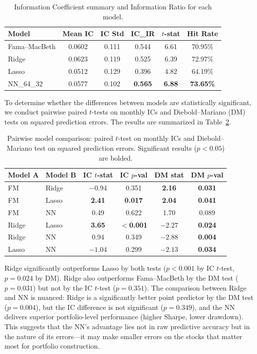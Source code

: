 \documentclass[11pt]{article}
\begin{document}
\begin{table}[H]
\centering
\caption{Information Coefficient summary and Information Ratio for each model.}
\label{tab:ic_ir}
\begin{tabular}{lccccc}
\toprule
Model & Mean IC & IC Std & IC\_IR & $t$-stat & Hit Rate \\
\midrule
Fama--MacBeth & 0.0602 & 0.111 & 0.544 & 6.61 & 70.95\% \\
Ridge         & 0.0623 & 0.119 & 0.525 & 6.39 & 72.97\% \\
Lasso         & 0.0512 & 0.129 & 0.396 & 4.82 & 64.19\% \\
NN\_64\_32    & 0.0577 & 0.102 & \textbf{0.565} & \textbf{6.88} & \textbf{73.65\%} \\
\bottomrule
\end{tabular}
\end{table}

To determine whether the differences between models are statistically significant, we conduct pairwise paired $t$-tests on monthly ICs and Diebold--Mariano (DM) tests \cite{diebold1995} on squared prediction errors. The results are summarized in Table~\ref{tab:significance}.

\begin{table}[H]
\centering
\caption{Pairwise model comparison: paired $t$-test on monthly ICs and Diebold--Mariano test on squared prediction errors. Significant results ($p < 0.05$) are bolded.}
\label{tab:significance}
\begin{tabular}{llcccc}
\toprule
Model A & Model B & IC $t$-stat & IC $p$-val & DM stat & DM $p$-val \\
\midrule
FM    & Ridge   & $-0.94$ & 0.351 & \textbf{2.16} & \textbf{0.031} \\
FM    & Lasso   & \textbf{2.41} & \textbf{0.017} & \textbf{2.04} & \textbf{0.041} \\
FM    & NN      & 0.49 & 0.622 & 1.70 & 0.089 \\
Ridge & Lasso   & \textbf{3.65} & \textbf{$<$0.001} & \textbf{$-2.27$} & \textbf{0.024} \\
Ridge & NN      & 0.94 & 0.349 & \textbf{$-2.88$} & \textbf{0.004} \\
Lasso & NN      & $-1.04$ & 0.299 & \textbf{$-2.13$} & \textbf{0.034} \\
\bottomrule
\end{tabular}
\end{table}

Ridge significantly outperforms Lasso by both tests ($p < 0.001$ by IC $t$-test, $p = 0.024$ by DM). Ridge also outperforms Fama--MacBeth by the DM test ($p = 0.031$) but not by the IC $t$-test ($p = 0.351$). The comparison between Ridge and NN is nuanced: Ridge is a significantly better point predictor by the DM test ($p = 0.004$), but the IC difference is not significant ($p = 0.349$), and the NN delivers superior portfolio-level performance (higher Sharpe, lower drawdown). This suggests that the NN's advantage lies not in raw predictive accuracy but in the nature of its errors---it may make smaller errors on the stocks that matter most for portfolio construction.
\end{document}
